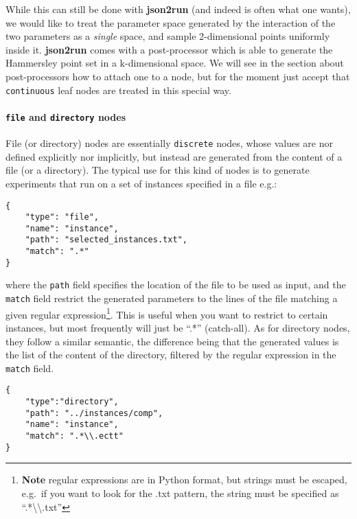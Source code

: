 \documentclass[11pt,notitlepage,twoside,a4paper]{article}
\begin{document}
\begin{footnotesize}
While this can still be done with \textbf{json2run} (and indeed is often
what one wants), we would like to treat the parameter space generated by
the interaction of the two parameters as a \emph{single} space, and
sample 2-dimensional points uniformly inside it. \textbf{json2run} comes
with a post-processor which is able to generate the Hammersley point set
in a k-dimensional space. We will see in the section about
post-processors how to attach one to a node, but for the moment just
accept that \texttt{continuous} leaf nodes are treated in this special
way.

\paragraph{\texttt{file} and \texttt{directory} nodes}

File (or directory) nodes are essentially \texttt{discrete} nodes, whose
values are nor defined explicitly nor implicitly, but instead are
generated from the content of a file (or a directory). The typical use
for this kind of nodes is to generate experiments that run on a set of
instances specified in a file e.g.:

\begin{lstlisting}
{
    "type": "file",
    "name": "instance",
    "path": "selected_instances.txt",
    "match": ".*"
}
\end{lstlisting}

\noindent
where the \texttt{path} field specifies the location of the file to be
used as input, and the \texttt{match} field restrict the generated
parameters to the lines of the file matching a given regular
expression\footnote{\textbf{Note} regular expressions are in Python
  format, but strings must be escaped, e.g.~if you want to look for the
  .txt pattern, the string must be specified as
  ``.*\textbackslash{}\textbackslash{}.txt''}. This is useful when you
want to restrict to certain instances, but most frequently will just be
``.*'' (catch-all). As for directory nodes, they follow a similar
semantic, the difference being that the generated values is the list of
the content of the directory, filtered by the regular expression in the
\texttt{match} field.

\begin{lstlisting}
{
    "type":"directory",
    "path": "../instances/comp",
    "name": "instance",
    "match": ".*\\.ectt"
}
\end{lstlisting}


\end{footnotesize}
\end{document}

